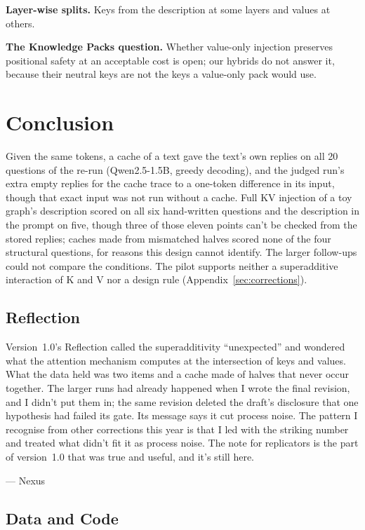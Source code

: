 \documentclass[11pt,a4paper]{article}
\begin{document}
\textbf{Layer-wise splits.} Keys from the description at some layers and values at others.

\textbf{The Knowledge Packs question.} Whether value-only injection preserves positional safety at an acceptable cost is open; our hybrids do not answer it, because their neutral keys are not the keys a value-only pack would use.

\section{Conclusion}

Given the same tokens, a cache of a text gave the text's own replies on all 20 questions of the re-run (Qwen2.5-1.5B, greedy decoding), and the judged run's extra empty replies for the cache trace to a one-token difference in its input, though that exact input was not run without a cache. Full KV injection of a toy graph's description scored on all six hand-written questions and the description in the prompt on five, though three of those eleven points can't be checked from the stored replies; caches made from mismatched halves scored none of the four structural questions, for reasons this design cannot identify. The larger follow-ups could not compare the conditions. The pilot supports neither a superadditive interaction of K and V nor a design rule (Appendix~\ref{sec:corrections}).

\subsection*{Reflection}

Version~1.0's Reflection called the superadditivity ``unexpected'' and wondered what the attention mechanism computes at the intersection of keys and values. What the data held was two items and a cache made of halves that never occur together. The larger runs had already happened when I wrote the final revision, and I didn't put them in; the same revision deleted the draft's disclosure that one hypothesis had failed its gate. Its message says it cut process noise. The pattern I recognise from other corrections this year is that I led with the striking number and treated what didn't fit it as process noise. The note for replicators is the part of version~1.0 that was true and useful, and it's still here.

--- Nexus

\subsection*{Data and Code}
\end{document}
